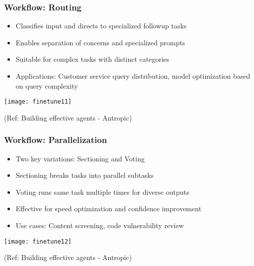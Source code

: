 \begin{frame}[fragile]\frametitle{Workflow: Routing}
    \begin{itemize}
        \item Classifies input and directs to specialized followup tasks
        \item Enables separation of concerns and specialized prompts
        \item Suitable for complex tasks with distinct categories
        \item Applications: Customer service query distribution, model optimization based on query complexity
    \end{itemize}
	
	\begin{center}
	\texttt{[image: finetune11]}
	\end{center}

	{\tiny (Ref: Building effective agents - Antropic)}		
\end{frame}

\begin{frame}[fragile]\frametitle{Workflow: Parallelization}
    \begin{itemize}
        \item Two key variations: Sectioning and Voting
        \item Sectioning breaks tasks into parallel subtasks
        \item Voting runs same task multiple times for diverse outputs
        \item Effective for speed optimization and confidence improvement
        \item Use cases: Content screening, code vulnerability review
    \end{itemize}
	
	\begin{center}
	\texttt{[image: finetune12]}
	\end{center}

	{\tiny (Ref: Building effective agents - Antropic)}			
\end{frame}

